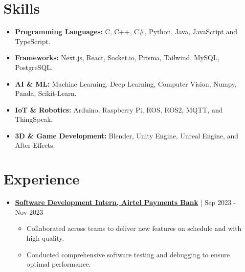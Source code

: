 \documentclass[a4paper,10pt]{article}
\newcommand{\sectionbreak}{\vspace{0.2em}} %
\newcommand{\subsectionbreak}{\vspace{0em}} %
\begin{document}
\section{Skills}
\begin{itemize}[noitemsep, topsep=0pt]
    \item \textbf{Programming Languages:} C, C++, C\#, Python, Java, JavaScript and TypeScript.
    \item \textbf{Frameworks:} Next.js, React, Socket.io, Prisma, Tailwind, MySQL, PostgreSQL.
    \item \textbf{AI \& ML:} Machine Learning, Deep Learning, Computer Vision, Numpy, Panda, Scikit-Learn.
    \item \textbf{IoT \& Robotics:} Arduino, Raspberry Pi, ROS, ROS2, MQTT, and ThingSpeak.
    \item \textbf{3D \& Game Development:} Blender, Unity Engine, Unreal Engine, and After Effects.
\end{itemize}
\sectionbreak

\section{Experience}
\begin{itemize}[noitemsep, topsep=0pt]
    \item \href{https://drive.google.com/file/d/1zCj8CKZbHcKEj6LS8N3VzG33aIENUIZA/view?usp=sharing}{\textcolor{accentcolor}{\textbf{
Software Development Intern, Airtel Payments Bank}}} | Sep 2023 - Nov 2023
        \subsectionbreak
        \begin{itemize}
            \item Collaborated across teams to deliver new features on schedule and with high quality.
            \item Conducted comprehensive software testing and debugging to ensure optimal performance.
        \end{itemize}
        \subsectionbreak
\end{itemize}

\sectionbreak

\end{document}
